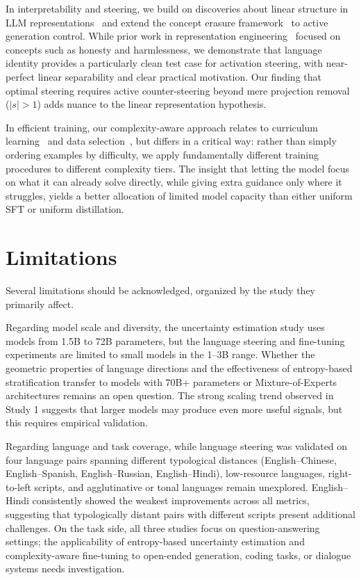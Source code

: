 In interpretability and steering, we build on discoveries about linear structure in LLM representations~\cite{park2023linear,turner2023activation} and extend the concept erasure framework~\cite{ravfogel2020null,belrose2023leace} to active generation control. While prior work in representation engineering~\cite{zou2023representation} focused on concepts such as honesty and harmlessness, we demonstrate that language identity provides a particularly clean test case for activation steering, with near-perfect linear separability and clear practical motivation. Our finding that optimal steering requires active counter-steering beyond mere projection removal ($|s| > 1$) adds nuance to the linear representation hypothesis.

In efficient training, our complexity-aware approach relates to curriculum learning~\cite{bengio2009curriculum} and data selection~\cite{settles2009active}, but differs in a critical way: rather than simply ordering examples by difficulty, we apply fundamentally different training procedures to different complexity tiers. The insight that letting the model focus on what it can already solve directly, while giving extra guidance only where it struggles, yields a better allocation of limited model capacity than either uniform SFT or uniform distillation.

\section{Limitations}

Several limitations should be acknowledged, organized by the study they primarily affect.

Regarding model scale and diversity, the uncertainty estimation study uses models from 1.5B to 72B parameters, but the language steering and fine-tuning experiments are limited to small models in the 1--3B range. Whether the geometric properties of language directions and the effectiveness of entropy-based stratification transfer to models with 70B+ parameters or Mixture-of-Experts architectures remains an open question. The strong scaling trend observed in Study 1 suggests that larger models may produce even more useful signals, but this requires empirical validation.

Regarding language and task coverage, while language steering was validated on four language pairs spanning different typological distances (English--Chinese, English--Spanish, English--Russian, English--Hindi), low-resource languages, right-to-left scripts, and agglutinative or tonal languages remain unexplored. English--Hindi consistently showed the weakest improvements across all metrics, suggesting that typologically distant pairs with different scripts present additional challenges. On the task side, all three studies focus on question-answering settings; the applicability of entropy-based uncertainty estimation and complexity-aware fine-tuning to open-ended generation, coding tasks, or dialogue systems needs investigation.

